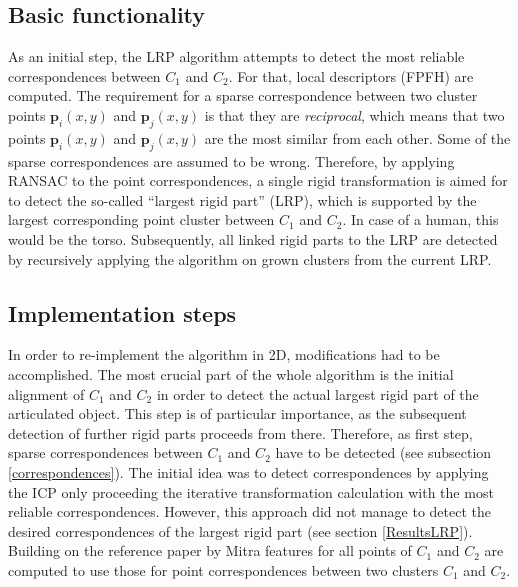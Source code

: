 \subsection{Basic functionality}
\label{functionalityLRP}
As an initial step, the LRP algorithm  attempts to detect the most reliable correspondences between $C_1$ and $C_2$. For that, local descriptors (FPFH) are computed. The requirement for a sparse correspondence between two cluster points $\boldsymbol{p}_i(x,y)$ and $\boldsymbol{p}_j(x,y)$ is that they are \textit{reciprocal}, which means that two points $\boldsymbol{p}_i(x,y)$ and $\boldsymbol{p}_j(x,y)$ are the most similar from each other. Some of the sparse correspondences are assumed to be wrong. Therefore, by applying RANSAC to the point correspondences, a single rigid transformation is aimed for to detect the so-called ``largest rigid part'' (LRP), which is supported by the largest corresponding point cluster between $C_1$ and $C_2$. In case of a human, this would be the torso. Subsequently, all linked rigid parts to the LRP are detected by recursively applying the algorithm on grown clusters from the current LRP.

\subsection{Implementation steps}

In order to re-implement the algorithm in 2D, modifications had to be accomplished. The most crucial part of the whole algorithm is the initial alignment of $C_1$ and $C_2$ in order to detect the actual largest rigid part of the articulated object. This step is of particular importance, as the subsequent detection of further rigid parts proceeds from there. Therefore, as first step, sparse correspondences between $C_1$ and $C_2$ have to be detected (see subsection \ref{correspondences}). The initial idea was to detect correspondences by applying the ICP only proceeding the iterative transformation calculation with the most reliable correspondences. However, this approach did not manage to detect the desired correspondences of the largest rigid part (see section \ref{ResultsLRP}). Building on the reference paper by Mitra \cite{Mitra07} features for all points of $C_1$ and $C_2$ are computed to use those for point correspondences between two clusters $C_1$ and $C_2$.

